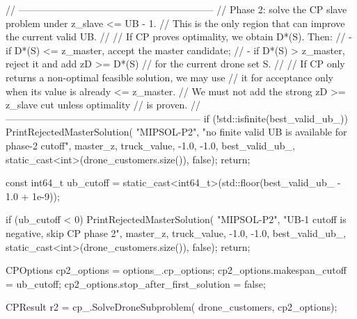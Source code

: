 {{{{                // ------------------------------------------------------------
                // Phase 2: solve the CP slave problem under z_slave <= UB - 1.
                // This is the only region that can improve the current valid UB.
                //
                // If CP proves optimality, we obtain D*(S). Then:
                //   - if D*(S) <= z_master, accept the master candidate;
                //   - if D*(S) >  z_master, reject it and add zD >= D*(S)
                //     for the current drone set S.
                //
                // If CP only returns a non-optimal feasible solution, we may use
                // it for acceptance only when its value is already <= z_master.
                // We must not add the strong zD >= z_slave cut unless optimality
                // is proven.
                // ------------------------------------------------------------
                if (!std::isfinite(best_valid_ub_))
                {
                    PrintRejectedMasterSolution(
                        "MIPSOL-P2",
                        "no finite valid UB is available for phase-2 cutoff",
                        master_z,
                        truck_value,
                        -1.0,
                        -1.0,
                        best_valid_ub_,
                        static_cast<int>(drone_customers.size()),
                        false);
                    return;
                }

                const int64_t ub_cutoff =
                    static_cast<int64_t>(std::floor(best_valid_ub_ - 1.0 + 1e-9));

                if (ub_cutoff < 0)
                {
                    PrintRejectedMasterSolution(
                        "MIPSOL-P2",
                        "UB-1 cutoff is negative, skip CP phase 2",
                        master_z,
                        truck_value,
                        -1.0,
                        -1.0,
                        best_valid_ub_,
                        static_cast<int>(drone_customers.size()),
                        false);
                    return;
                }

                CPOptions cp2_options = options_.cp_options;
                cp2_options.makespan_cutoff = ub_cutoff;
                cp2_options.stop_after_first_solution = false;

                CPResult r2 = cp_.SolveDroneSubproblem(
                    drone_customers,
                    cp2_options);

}}}}

